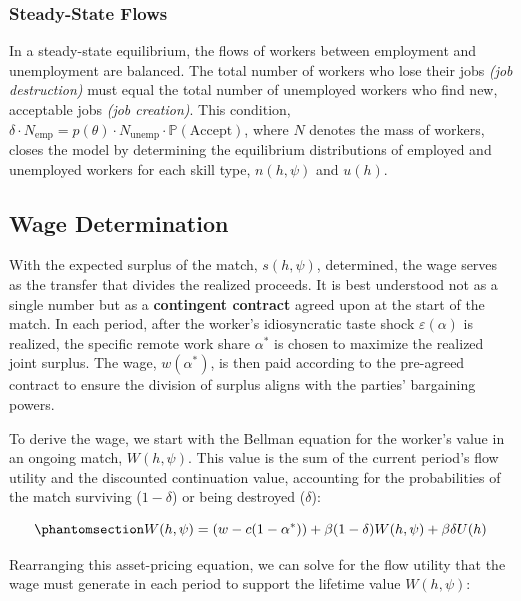 \documentclass[
  11pt,
  letterpaper,
  DIV=11,
  numbers=noendperiod]{scrartcl}
\begin{document}
\subsubsection{Steady-State Flows}\label{steady-state-flows}

In a steady-state equilibrium, the flows of workers between employment
and unemployment are balanced. The total number of workers who lose
their jobs \emph{(job destruction)} must equal the total number of
unemployed workers who find new, acceptable jobs \emph{(job creation)}.
This condition,
\(\delta \cdot N_{\text{emp}}​=p(\theta)\cdot N_{\text{unemp}}​\cdot \mathbb{P}(\text{Accept})\),
where \(N\) denotes the mass of workers, closes the model by determining
the equilibrium distributions of employed and unemployed workers for
each skill type, \(n(h,\psi)\) and \(u(h)\).

\subsection{Wage Determination}\label{wage-determination}

With the expected surplus of the match, \(s(h,\psi)\), determined, the
wage serves as the transfer that divides the realized proceeds. It is
best understood not as a single number but as a \textbf{contingent
contract} agreed upon at the start of the match. In each period, after
the worker's idiosyncratic taste shock \(\varepsilon(\alpha)\) is
realized, the specific remote work share \(\alpha^*\) is chosen to
maximize the realized joint surplus. The wage, \(w(\alpha^*)\), is then
paid according to the pre-agreed contract to ensure the division of
surplus aligns with the parties' bargaining powers.

To derive the wage, we start with the Bellman equation for the worker's
value in an ongoing match, \(W(h, \psi)\). This value is the sum of the
current period's flow utility and the discounted continuation value,
accounting for the probabilities of the match surviving (\(1-\delta\))
or being destroyed (\(\delta\)):

\begin{equation}\phantomsection\label{eq-value-employed}{ W(h, \psi) = \left( w - c(1-\alpha^*) \right) + \beta(1-\delta)W(h,\psi) + \beta\delta U(h) }\end{equation}

Rearranging this asset-pricing equation, we can solve for the flow
utility that the wage must generate in each period to support the
lifetime value \(W(h, \psi)\):
\end{document}
